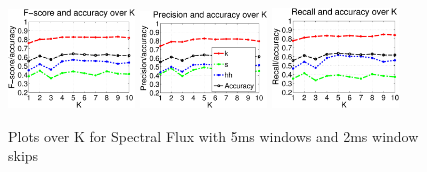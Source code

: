 \begin{figure}


	\centering\includegraphics[width=0.3\textwidth]{sflux52FP.png}
	\centering\includegraphics[width=0.3\textwidth]{sflux52_P.png}
	\centering\includegraphics[width=0.3\textwidth]{sflux52_R.png}
		
		\caption{Plots over K for Spectral Flux with 5ms windows and 2ms window skips}
\end{figure}


